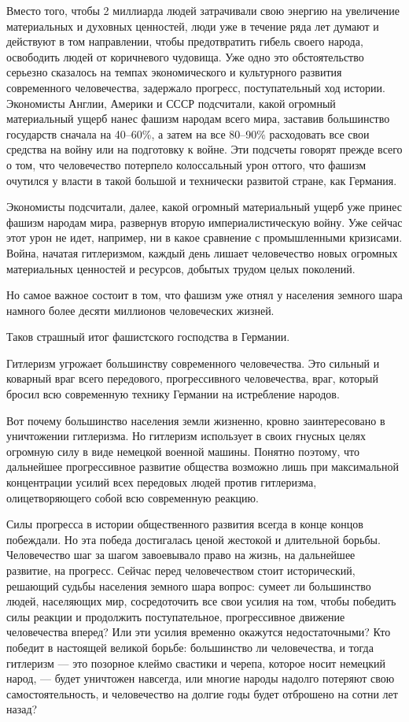 \documentclass[12pt, a4paper, openany]{book}
\begin{document}
Вместо того, чтобы 2 миллиарда людей затрачивали свою энергию на увеличение материальных и духовных ценностей, люди уже в течение ряда лет думают и действуют в том направлении, чтобы предотвратить гибель своего народа, освободить людей от коричневого чудовища. Уже одно это обстоятельство серьезно сказалось на темпах экономического и культурного развития современного человечества, задержало прогресс, поступательный ход истории. Экономисты Англии, Америки и СССР подсчитали, какой огромный материальный ущерб нанес фашизм народам всего мира, заставив большинство государств сначала на 40–60\%, а затем на все 80–90\% расходовать все свои средства на войну или на подготовку к войне. Эти подсчеты говорят прежде всего о том, что человечество потерпело колоссальный урон оттого, что фашизм очутился у власти в такой большой и технически развитой стране, как Германия.

Экономисты подсчитали, далее, какой огромный материальный ущерб уже принес фашизм народам мира, развернув вторую империалистическую войну. Уже сейчас этот урон не идет, например, ни в какое сравнение с промышленными кризисами. Война, начатая гитлеризмом, каждый день лишает человечество новых огромных материальных ценностей и ресурсов, добытых трудом целых поколений.

Но самое важное состоит в том, что фашизм уже отнял у населения земного шара намного более десяти миллионов человеческих жизней.

Таков страшный итог фашистского господства в Германии.

Гитлеризм угрожает большинству современного человечества. Это сильный и коварный враг всего передового, прогрессивного человечества, враг, который бросил всю современную технику Германии на истребление народов.

Вот почему большинство населения земли жизненно, кровно заинтересовано в уничтожении гитлеризма. Но гитлеризм использует в своих гнусных целях огромную силу в виде немецкой военной машины. Понятно поэтому, что дальнейшее прогрессивное развитие общества возможно лишь при максимальной концентрации усилий всех передовых людей против гитлеризма, олицетворяющего собой всю современную реакцию.

Силы прогресса в истории общественного развития всегда в конце концов побеждали. Но эта победа достигалась ценой жестокой и длительной борьбы. Человечество шаг за шагом завоевывало право на жизнь, на дальнейшее развитие, на прогресс. Сейчас перед человечеством стоит исторический, решающий судьбы населения земного шара вопрос: сумеет ли большинство людей, населяющих мир, сосредоточить все свои усилия на том, чтобы победить силы реакции и продолжить поступательное, прогрессивное движение человечества вперед? Или эти усилия временно окажутся недостаточными? Кто победит в настоящей великой борьбе: большинство ли человечества, и тогда гитлеризм — это позорное клеймо свастики и черепа, которое носит немецкий народ, — будет уничтожен навсегда, или многие народы надолго потеряют свою самостоятельность, и человечество на долгие годы будет отброшено на сотни лет назад?
\end{document}
